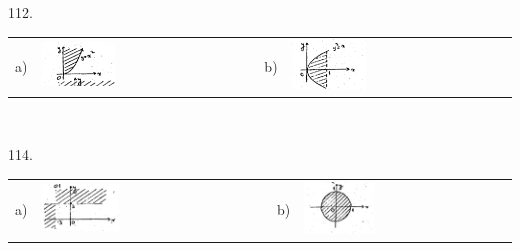 \documentclass[11pt]{amsbook}
\begin{document}
\begin{hEnumerateArabic}

\item[112.]

  \begin{tabular}{p{0pt} p{} p{0pt} p{}}
    \vspace{0pt} a)
    &
    \vspace{0pt} \includegraphics[width=0.35\textwidth]{images/b2p2-359-fig01}
    &
    \vspace{0pt} b)
    &
    \vspace{0pt} \includegraphics[width=0.35\textwidth]{images/b2p2-359-fig02}
  \end{tabular}
\\

\item[114.]

  \begin{tabular}{p{0pt} p{} p{0pt} p{}}
    \vspace{0pt} a)
    &
    \vspace{0pt} \includegraphics[width=0.35\textwidth]{images/b2p2-359-fig03}
    &
    \vspace{0pt} b)
    &
    \vspace{0pt} \includegraphics[width=0.35\textwidth]{images/b2p2-359-fig04}
  \end{tabular}
\\


\end{hEnumerateArabic}
\end{document}
